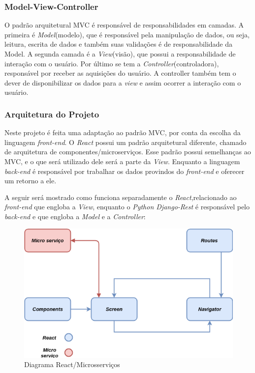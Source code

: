 \subsubsection{Model-View-Controller}
\label{sec:mvc}

O padrão arquitetural MVC é responsável de responsabilidades em camadas. A primeira é \textit{Model}(modelo), que é responsável pela manipulação de dados, ou seja, leitura, escrita de dados e também suas validações é de responsabilidade da Model. A segunda camada é a \textit{View}(visão), que possui a responsabilidade de interação com o usuário. Por último se tem a \textit{Controller}(controladora), responsável por receber as aquisições do usuário. A controller também tem o dever de disponibilizar os dados para a \textit{view} e assim ocorrer a interação com o usuário.

\subsubsection{Arquitetura do Projeto}

Neste projeto é feita uma adaptação ao padrão MVC, por conta da escolha da linguagem \textit{front-end}. O \textit{React} possui um padrão arquitetural diferente, chamado de arquitetura de componentes/microserviços. Esse padrão possui semelhanças ao MVC, e o que será utilizado dele será a parte da \textit{View}. Enquanto a linguagem \textit{back-end} é responsável por trabalhar os dados provindos do \textit{front-end} e oferecer um retorno a ele. 

A seguir será mostrado como funciona separadamente o \textit{React},relacionado ao \textit{front-end} que engloba a \textit{View}, enquanto o \textit{Python Django-Rest} é responsável pelo \textit{back-end} e que engloba a \textit{Model} e a \textit{Controller}:

\begin{figure}[H]
	\centering
	\includegraphics[width=1.0\textwidth]{figuras/diagrama_react.png}
	\caption{Diagrama React/Microsserviços}
	\label{img:diagrama_react}
\end{figure}

